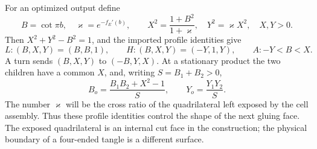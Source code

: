 \documentclass[11pt]{article}
\numberwithin{equation}{section}
\theoremstyle{definition}\newtheorem{definition}[theorem]{Definition}
\theoremstyle{remark}\newtheorem{remark}[theorem]{Remark}
\newcommand{\kap}{\varkappa}
\begin{document}
For an optimized output define
\begin{equation}\label{sm:profile-data}
 B=\cot\pi b,\quad \kap=e^{-f_E'(b)},\qquad
 X^2=\frac{1+B^2}{1+\kap},\quad Y^2=\kap X^2,
 \quad X,Y>0.
\end{equation}
Then $X^2+Y^2-B^2=1$, and the imported profile identities give
\begin{equation}\label{sm:profile-types}
 L:(B,X,Y)=(B,B,1),\qquad H:(B,X,Y)=(-Y,1,Y),
 \qquad A:-Y<B<X.
\end{equation}
A turn sends $(B,X,Y)$ to $(-B,Y,X)$. At a stationary product the
two children have a common $X$, and, writing $S=B_1+B_2>0$,
\begin{equation}\label{sm:profile-product}
       B_o=\frac{B_1B_2+X^2-1}{S},\qquad
       Y_o=\frac{Y_1Y_2}{S}.
\end{equation}
The number $\kap$ will be the cross ratio of the quadrilateral left
exposed by the cell assembly. Thus these profile identities control
the shape of the next gluing face. The exposed quadrilateral is an
internal cut face in the construction; the physical boundary of a
four-ended tangle is a different surface.






\end{document}
